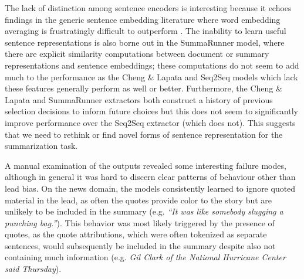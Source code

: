 The lack of distinction among sentence encoders is interesting because 
it echoes findings in the generic sentence embedding literature 
where word embedding averaging is frustratingly difficult to 
outperform  \citep{iyyer2015deep,wieting2015towards,arora2016simple,wieting2017revisiting}.
The inability to learn useful sentence representations is also 
borne out in the 
SummaRunner model, where there are explicit similarity computations
between document or summary representations and sentence embeddings;
these computations do not seem to add much to the performance as the 
Cheng \& Lapata and Seq2Seq models which lack these features generally
perform as well or better.
Furthermore, the Cheng \& Lapata and SummaRunner extractors both construct
a history of previous selection decisions to inform future choices but this
does not seem to significantly improve performance over the Seq2Seq extractor 
(which does not). This suggests that we need to rethink or find novel forms 
of sentence representation for the summarization task.%


A manual examination of the outputs revealed some interesting failure modes,
although in general it was hard to discern clear patterns of behaviour 
other than lead bias. On the news domain, the models consistently learned 
to ignore quoted material in the lead, as often the quotes provide
color to the story but are unlikely to be included in the summary (e.g. \textit{``It was like somebody slugging a punching bag.''}). 
This behavior was most likely triggered by the presence of quotes, as the
quote attributions, which were often tokenized as separate sentences,
would subsequently be included in the summary despite also not containing 
much information 
(e.g. \textit{Gil Clark of the National Hurricane Center said Thursday}). %




%


